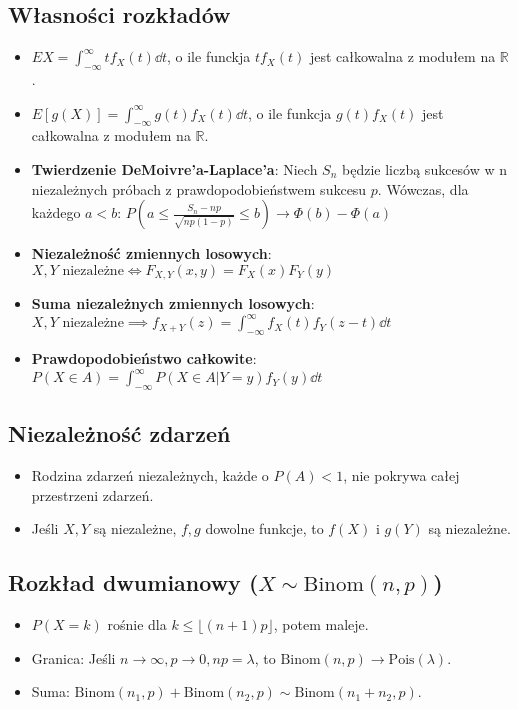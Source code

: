 \documentclass{article}
\theoremstyle{definition}
\theoremstyle{remark}
\begin{document}
\begin{multicols}{2}
    \subsection*{Własności rozkładów}

    \begin{itemize}[itemsep=0pt, left=0pt]
        \item \(EX = \int_{-\infty}^{\infty}{tf_X(t) \dd{t}}\), o ile funckja \(tf_X(t)\) jest całkowalna z modułem na \(\mathbb{R}\).
        \item \(E[g(X)] = \int_{-\infty}^{\infty}{g(t)f_X(t) \dd{t}}\), o ile funkcja \(g(t)f_X(t)\) jest całkowalna z modułem na \(\mathbb{R}\).
        \item \textbf{Twierdzenie DeMoivre'a-Laplace'a}: Niech \(S_n\) będzie liczbą sukcesów w n niezależnych próbach z
        prawdopodobieństwem sukcesu \(p\). Wówczas, dla każdego \(a < b\): \(P(a \leq \frac{S_n - np}{\sqrt{np(1-p)}} \leq b) \to \Phi(b) - \Phi(a)\)
        \item \textbf{Niezależność zmiennych losowych}: \(X,Y \text{ niezależne} \iff F_{X,Y}(x,y) = F_X(x)F_Y(y)\)
        \item \textbf{Suma niezależnych zmiennych losowych}: \(X,Y \text{ niezależne} \implies f_{X+Y}(z) = \int_{-\infty}^{\infty}{f_X(t)f_Y(z-t) \dd{t}}\)
        \item \textbf{Prawdopodobieństwo całkowite}: \(P(X \in A) = \int_{-\infty}^{\infty}{P(X \in A | Y = y) f_Y(y) \dd{t}}\)
    \end{itemize}

    \subsection*{Niezależność zdarzeń}
    \begin{itemize}[itemsep=0pt, left=0pt]
        \item Rodzina zdarzeń niezależnych, każde o \( P(A) < 1 \), nie pokrywa całej przestrzeni zdarzeń.
        \item Jeśli \( X, Y \) są niezależne, \( f, g \) dowolne funkcje, to \( f(X) \) i \( g(Y) \) są niezależne.
    \end{itemize}
    
    \subsection*{Rozkład dwumianowy (\( X \sim \text{Binom}(n, p) \))}
    \begin{itemize}[itemsep=0pt, left=0pt]
        \item \( P(X=k) \) rośnie dla \( k \leq \lfloor (n+1)p \rfloor \), potem maleje.
        \item Granica: Jeśli \( n \to \infty, p \to 0, np = \lambda \), to \( \text{Binom}(n, p) \to \text{Pois}(\lambda) \).
        \item Suma: \( \text{Binom}(n_1, p) + \text{Binom}(n_2, p) \sim \text{Binom}(n_1+n_2, p) \).
    \end{itemize}
    

\end{multicols}
\end{document}
